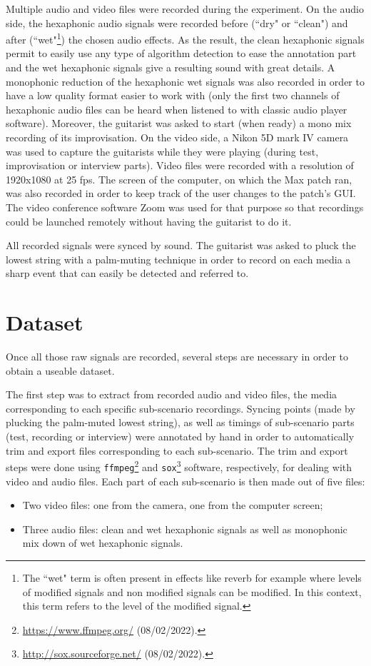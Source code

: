 \documentclass{article}
\begin{document}
Multiple audio and video files were recorded during the experiment. 
On the audio side, the hexaphonic audio signals were recorded before (``dry" or ``clean") and after \linebreak(``wet"\footnote{The ``wet" term is often present in effects like reverb for example where levels of modified signals and non modified signals can be modified. In this context, this term refers to the level of the modified signal.}) the chosen audio effects. As the result, the clean hexaphonic signals permit to easily use any type of algorithm detection to ease the annotation part and the wet hexaphonic signals give a resulting sound with great details. A monophonic reduction of the hexaphonic wet signals was also recorded in order to have a low quality format easier to work with (only the first two channels of hexaphonic audio files can be heard when listened to with classic audio player software).
Moreover, the guitarist was asked to start (when ready) a mono mix recording of its improvisation. 
On the video side, a Nikon 5D mark IV camera was used to capture the guitarists while they were playing (during test, improvisation or interview parts). Video files were recorded with a resolution of 1920x1080 at 25 fps. The screen of the computer, on which the Max patch ran, was also recorded in order to keep track of the user changes to the patch's GUI. The video conference software Zoom was used for that purpose so that recordings could be launched remotely without having the guitarist to do it.

All recorded signals were synced by sound. The guitarist was asked to pluck the lowest string with a palm-muting technique in order to record on each media a sharp event that can easily be detected and referred to.

\section{Dataset}\label{sec:dataset}
Once all those raw signals are recorded, several steps are necessary in order to obtain a useable dataset. 

The first step was to extract from recorded audio and video files, the media corresponding to each specific sub-scenario recordings. Syncing points (made by plucking the palm-muted lowest string), as well as timings of sub-scenario parts (test, recording or interview) were annotated by hand in order to automatically trim and export files corresponding to each sub-scenario. The trim and export steps were done using \texttt{ffmpeg}\footnote{\url{https://www.ffmpeg.org/} (08/02/2022).} and \texttt{sox}\footnote{\url{http://sox.sourceforge.net/} (08/02/2022).} software, respectively, for dealing with video and audio files. Each part of each sub-scenario is then made out of five files: 
\begin{itemize}
\item Two video files: one from the camera, one from the computer screen;
\item Three audio files: clean and wet hexaphonic signals as well as monophonic mix down of wet hexaphonic signals.
\end{itemize}  
\end{document}
